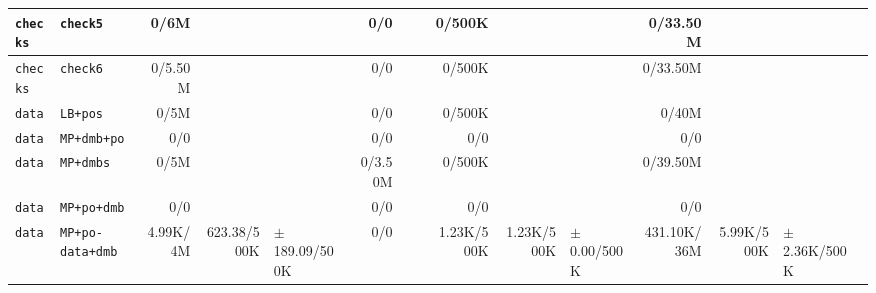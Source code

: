 \begin{tabular}{l l  | r r l | r r l | r r l | r r l l}
      \verb|checks| &                                              \verb|check5| &           0/6M &                       &                   &            0/0 &                       &                 &         0/500K &                       &                   &       0/33.50M &                       &                   & \\ \hline 
      \verb|checks| &                                              \verb|check6| &        0/5.50M &                       &                   &            0/0 &                       &                 &         0/500K &                       &                   &       0/33.50M &                       &                   & \\ \hline 
        \verb|data| &                                              \verb|LB+pos| &           0/5M &                       &                   &            0/0 &                       &                 &         0/500K &                       &                   &          0/40M &                       &                   & \\ \hline 
        \verb|data| &                                           \verb|MP+dmb+po| &            0/0 &                       &                   &            0/0 &                       &                 &            0/0 &                       &                   &            0/0 &                       &                   & \\ \hline 
        \verb|data| &                                             \verb|MP+dmbs| &           0/5M &                       &                   &        0/3.50M &                       &                 &         0/500K &                       &                   &       0/39.50M &                       &                   & \\ \hline 
        \verb|data| &                                           \verb|MP+po+dmb| &            0/0 &                       &                   &            0/0 &                       &                 &            0/0 &                       &                   &            0/0 &                       &                   & \\ \hline 
        \verb|data| &                                      \verb|MP+po-data+dmb| &       4.99K/4M &           623.38/500K & $\pm$ 189.09/500K &            0/0 &                       &                 &     1.23K/500K &            1.23K/500K &   $\pm$ 0.00/500K &    431.10K/36M &            5.99K/500K &  $\pm$ 2.36K/500K & \\ \hline 

\end{tabular}
